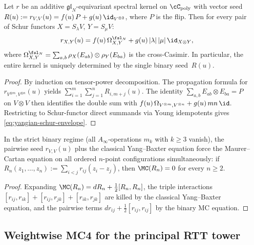 \begin{theorem}
\label{thm:yangian-vector-seed-propagation}
Let $r$ be an additive $\mathfrak{gl}_N$-equivariant spectral kernel
on $\cC_{\mathrm{poly}}$ with vector seed
$R(u) := r_{V,V}(u) = f(u)\,P + g(u)\,\id_{V^{\otimes 2}}$,
where $P$ is the flip.
Then for every pair of Schur functors
$X = S_\lambda V$, $Y = S_\mu V$:
\begin{equation}\label{eq:yangian-schur-envelope}
 r_{X,Y}(u) = f(u)\,\Omega^{\fsl_N}_{X,Y}
 + g(u)\,|\lambda|\,|\mu|\,\id_{X \otimes Y},
\end{equation}
where $\Omega^{\fsl_N}_{X,Y} = \sum_{a,b}\rho_X(E_{ab})
\otimes \rho_Y(E_{ba})$ is the cross-Casimir.
In particular, the entire kernel is uniquely determined by the
single binary seed~$R(u)$.
\end{theorem}

\begin{proof}
By induction on tensor-power decomposition. The propagation formula
for $r_{V^{\otimes m},V^{\otimes n}}(u)$ yields
$\sum_{i=1}^m \sum_{j=1}^n R_{i,m+j}(u)$. The identity
$\sum_{a,b} E_{ab} \otimes E_{ba} = P$ on $V \otimes V$ then
identifies the double sum with $f(u)\,\Omega_{V^{\otimes m},
V^{\otimes n}} + g(u)\,mn\,\id$. Restricting to Schur-functor
direct summands via Young idempotents gives
\eqref{eq:yangian-schur-envelope}.
\end{proof}

\begin{corollary}
\label{cor:compact-core-rigidity}
In the strict binary regime (all $A_\infty$-operations $m_k$ with
$k \ge 3$ vanish), the pairwise seed $r_{V,V}(u)$ plus the classical
Yang--Baxter equation force the Maurer--Cartan equation on all
ordered $n$-point configurations simultaneously: if
$R_n(z_1,\dots,z_n) := \sum_{i<j} r_{ij}(z_i - z_j)$, then
$\MC(R_n) = 0$ for every $n \ge 2$.
\end{corollary}

\begin{proof}
Expanding $\MC(R_n) = dR_n + \tfrac12[R_n,R_n]$, the triple
interactions $[r_{ij},r_{ik}] + [r_{ij},r_{jk}] + [r_{ik},r_{jk}]$
are killed by the classical Yang--Baxter equation, and the pairwise
terms $dr_{ij} + \tfrac12[r_{ij},r_{ij}]$ by the binary MC equation.
\end{proof}

\subsection{Weightwise MC4 for the principal RTT tower}

